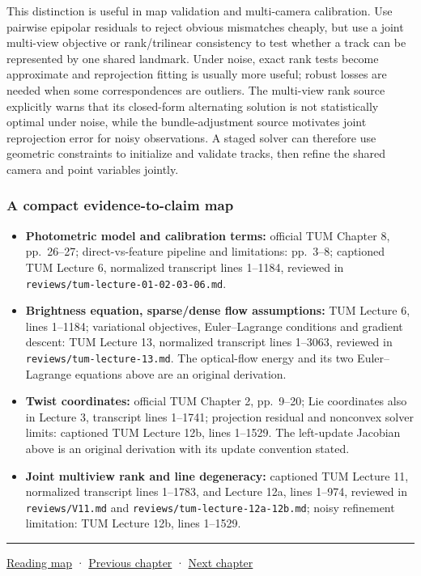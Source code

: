 This distinction is useful in map validation and multi-camera calibration. Use pairwise epipolar residuals to reject obvious mismatches cheaply, but use a joint multi-view objective or rank/trilinear consistency to test whether a track can be represented by one shared landmark. Under noise, exact rank tests become approximate and reprojection fitting is usually more useful; robust losses are needed when some correspondences are outliers. The multi-view rank source explicitly warns that its closed-form alternating solution is not statistically optimal under noise, while the bundle-adjustment source motivates joint reprojection error for noisy observations. A staged solver can therefore use geometric constraints to initialize and validate tracks, then refine the shared camera and point variables jointly.

\subsubsection{A compact evidence-to-claim map}\label{02-foundations-ii-ch036-a-compact-evidence-to-claim-map}

\begin{itemize}
\tightlist
\item
  \textbf{Photometric model and calibration terms:} official TUM Chapter 8, pp.~26--27; direct-vs-feature pipeline and limitations: pp.~3--8; captioned TUM Lecture 6, normalized transcript lines 1--1184, reviewed in \texttt{reviews/tum-lecture-01-02-03-06.md}.
\item
  \textbf{Brightness equation, sparse/dense flow assumptions:} TUM Lecture 6, lines 1--1184; variational objectives, Euler--Lagrange conditions and gradient descent: TUM Lecture 13, normalized transcript lines 1--3063, reviewed in \texttt{reviews/tum-lecture-13.md}. The optical-flow energy and its two Euler--Lagrange equations above are an original derivation.
\item
  \textbf{Twist coordinates:} official TUM Chapter 2, pp.~9--20; Lie coordinates also in Lecture 3, transcript lines 1--1741; projection residual and nonconvex solver limits: captioned TUM Lecture 12b, lines 1--1529. The left-update Jacobian above is an original derivation with its update convention stated.
\item
  \textbf{Joint multiview rank and line degeneracy:} captioned TUM Lecture 11, normalized transcript lines 1--1783, and Lecture 12a, lines 1--974, reviewed in \texttt{reviews/V11.md} and \texttt{reviews/tum-lecture-12a-12b.md}; noisy refinement limitation: TUM Lecture 12b, lines 1--1529.
\end{itemize}

\begin{center}\rule{0.5\linewidth}{0.5pt}\end{center}

\hyperref[volume-reading-map]{Reading map} · \hyperref[02-foundations-ii-ch035-camera-extrinsics-and-projection-geometry]{Previous chapter} · \hyperref[02-foundations-ii-ch037-camera-contracts-and-transform-chain-debugging]{Next chapter}
